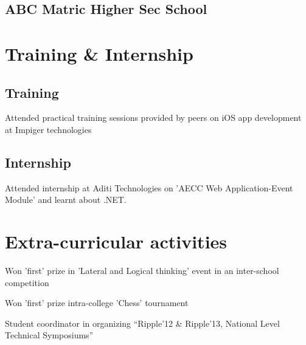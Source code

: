 \documentclass[a4paper]{srika-resume} %
\begin{document}
\begin{minipage}[t]{0.35\textwidth}
\sectionspace %


\subsection{ABC Matric Higher Sec School}


\sectionspace %


\section{Training \& Internship}

\subsection {Training}

Attended practical training sessions provided by peers on iOS app development at Impiger technologies

\sectionspace %
 

\subsection {Internship}

Attended internship at Aditi Technologies on 'AECC Web Application-Event Module' and learnt about .NET.

\sectionspace %

 

\section{Extra-curricular activities} 
\begin{tightitemizespaced}
\item Won 'first' prize in 'Lateral and Logical thinking' event in an inter-school competition
\item Won 'first' prize intra-college 'Chess' tournament
\item Student coordinator in organizing “Ripple'12 \& Ripple'13, National Level Technical Symposiums”
\end{tightitemizespaced}


\end{minipage}
\end{document}
